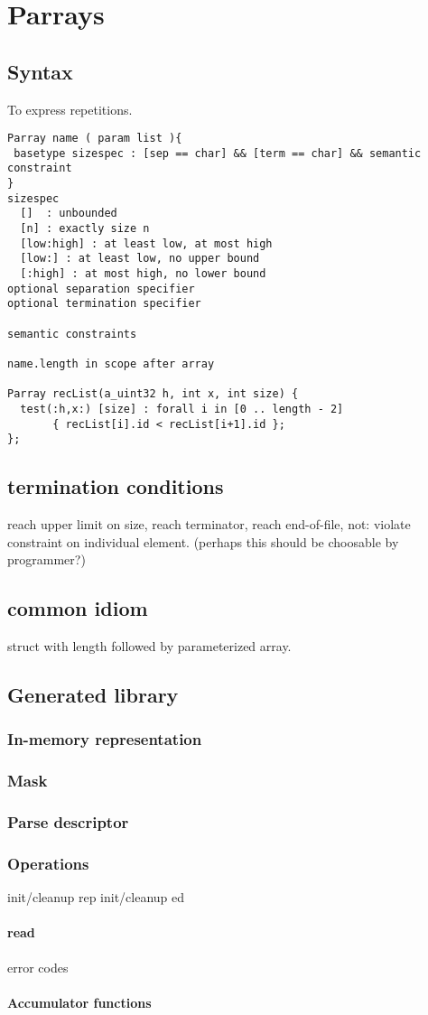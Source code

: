 \chapter{Parrays}
\label{chap:arrays}
\section{Syntax}
To express repetitions.  

\begin{verbatim}
Parray name ( param list ){
 basetype sizespec : [sep == char] && [term == char] && semantic constraint
}
sizespec 
  []  : unbounded
  [n] : exactly size n
  [low:high] : at least low, at most high
  [low:] : at least low, no upper bound
  [:high] : at most high, no lower bound
optional separation specifier
optional termination specifier

semantic constraints

name.length in scope after array

Parray recList(a_uint32 h, int x, int size) {
  test(:h,x:) [size] : forall i in [0 .. length - 2]
       { recList[i].id < recList[i+1].id };
};
\end{verbatim}
\section{termination conditions}
reach upper limit on size, reach terminator, reach end-of-file, 
not: violate constraint on individual element. (perhaps this should be
choosable by programmer?)


\section{common idiom}
struct with length followed by parameterized array.


\section{Generated library}
\subsection{In-memory representation}
\label{sec:arrays-rep}
\subsection{Mask}
\label{sec:arrays-masks}
\subsection{Parse descriptor}
\label{sec:arrays-parse-descriptors}
\subsection{Operations}
init/cleanup rep
init/cleanup ed
\subsubsection{read}
  error codes
\subsubsection{Accumulator functions}

